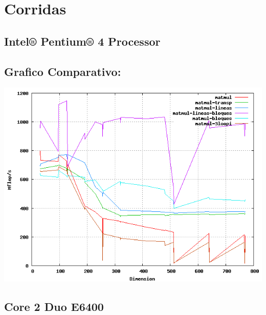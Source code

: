 \documentclass[a4paper,10pt]{article}
\begin{document}
\clearpage
\section{Corridas}

\subsection{Intel® Pentium® 4 Processor}


\clearpage

\clearpage

\clearpage

\clearpage

\clearpage

\subsection{Grafico Comparativo: }
\includegraphics[width=15cm, bb=0 0 640 480]{./pentium 4-plot.png}
\clearpage

\subsection{Core 2 Duo E6400}


\clearpage

\clearpage

\clearpage

\clearpage

\clearpage

\clearpage
\end{document}
